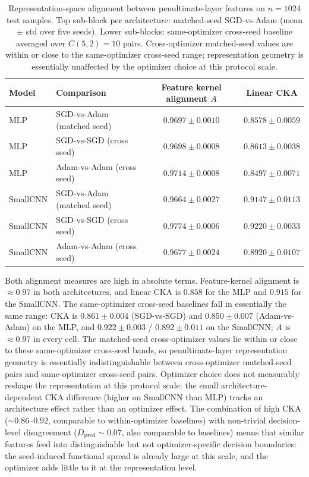 \begin{table}[H]
\centering
\small
\begin{tabular}{llcc}
\toprule
\textbf{Model} & \textbf{Comparison} & \textbf{Feature kernel alignment $A$} & \textbf{Linear CKA} \\
\midrule
MLP      & SGD-vs-Adam (matched seed) & $0.9697 \pm 0.0010$ & $0.8578 \pm 0.0059$ \\
MLP      & SGD-vs-SGD (cross seed)    & $0.9698 \pm 0.0008$ & $0.8613 \pm 0.0038$ \\
MLP      & Adam-vs-Adam (cross seed)  & $0.9714 \pm 0.0008$ & $0.8497 \pm 0.0071$ \\
\addlinespace
SmallCNN & SGD-vs-Adam (matched seed) & $0.9664 \pm 0.0027$ & $0.9147 \pm 0.0113$ \\
SmallCNN & SGD-vs-SGD (cross seed)    & $0.9774 \pm 0.0006$ & $0.9220 \pm 0.0033$ \\
SmallCNN & Adam-vs-Adam (cross seed)  & $0.9677 \pm 0.0024$ & $0.8920 \pm 0.0107$ \\
\bottomrule
\end{tabular}
\caption{Representation-space alignment between penultimate-layer features on $n=1024$ test samples. Top sub-block per architecture: matched-seed SGD-vs-Adam (mean $\pm$ std over five seeds). Lower sub-blocks: same-optimizer cross-seed baseline averaged over $C(5,2)=10$ pairs. Cross-optimizer matched-seed values are within or close to the same-optimizer cross-seed range; representation geometry is essentially unaffected by the optimizer choice at this protocol scale.}
\label{tab:representation}
\end{table}

Both alignment measures are high in absolute terms. Feature-kernel alignment is $\approx 0.97$ in both architectures, and linear CKA is $0.858$ for the MLP and $0.915$ for the SmallCNN. The same-optimizer cross-seed baselines fall in essentially the same range: CKA is $0.861 \pm 0.004$ (SGD-vs-SGD) and $0.850 \pm 0.007$ (Adam-vs-Adam) on the MLP, and $0.922 \pm 0.003$ / $0.892 \pm 0.011$ on the SmallCNN; $A$ is $\approx 0.97$ in every cell. The matched-seed cross-optimizer values lie within or close to these same-optimizer cross-seed bands, so penultimate-layer representation geometry is essentially indistinguishable between cross-optimizer matched-seed pairs and same-optimizer cross-seed pairs. Optimizer choice does not measurably reshape the representation at this protocol scale: the small architecture-dependent CKA difference (higher on SmallCNN than MLP) tracks an architecture effect rather than an optimizer effect. The combination of high CKA ($\sim 0.86$--$0.92$, comparable to within-optimizer baselines) with non-trivial decision-level disagreement ($D_{\mathrm{pred}} \sim 0.07$, also comparable to baselines) means that similar features feed into distinguishable but not optimizer-specific decision boundaries: the seed-induced functional spread is already large at this scale, and the optimizer adds little to it at the representation level.

